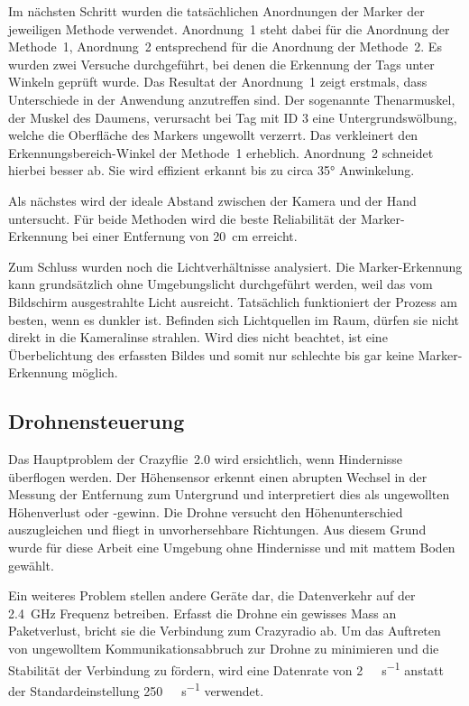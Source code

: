 Im nächsten Schritt wurden die tatsächlichen Anordnungen der Marker der jeweiligen Methode verwendet.
Anordnung~1 steht dabei für die Anordnung der Methode~1, Anordnung~2 entsprechend für die Anordnung der Methode~2.
Es wurden zwei Versuche durchgeführt, bei denen die Erkennung der Tags unter Winkeln geprüft wurde.
Das Resultat der Anordnung~1 zeigt erstmals, dass Unterschiede in der Anwendung anzutreffen sind.
Der sogenannte Thenarmuskel, der Muskel des Daumens, verursacht bei Tag mit ID 3 eine Untergrundswölbung, welche die Oberfläche des Markers ungewollt verzerrt.
Das verkleinert den Erkennungsbereich-Winkel der Methode~1 erheblich.
Anordnung~2 schneidet hierbei besser ab.
Sie wird effizient erkannt bis zu circa 35° Anwinkelung\footnotemark{}.

Als nächstes wird der ideale Abstand zwischen der Kamera und der Hand untersucht.
Für beide Methoden wird die beste Reliabilität der Marker-Erkennung bei einer Entfernung von \SI{20}{\centi\meter} erreicht.

Zum Schluss wurden noch die Lichtverhältnisse analysiert.
Die Marker-Erkennung kann grundsätzlich ohne Umgebungslicht durchgeführt werden, weil das vom Bildschirm ausgestrahlte Licht ausreicht.
Tatsächlich funktioniert der Prozess am besten, wenn es dunkler ist.
Befinden sich Lichtquellen im Raum, dürfen sie nicht direkt in die Kameralinse strahlen.
Wird dies nicht beachtet, ist eine Überbelichtung des erfassten Bildes und somit nur schlechte bis gar keine Marker-Erkennung möglich.

\subsection{Drohnensteuerung}
\label{sec:drco}

Das Hauptproblem der Crazyflie~2.0 wird ersichtlich, wenn Hindernisse überflogen werden.
Der Höhensensor erkennt einen abrupten Wechsel in der Messung der Entfernung zum Untergrund und interpretiert dies als ungewollten Höhenverlust oder -gewinn.
Die Drohne versucht den Höhenunterschied auszugleichen und fliegt in unvorhersehbare Richtungen.
Aus diesem Grund wurde für diese Arbeit eine Umgebung ohne Hindernisse und mit mattem Boden gewählt.

Ein weiteres Problem stellen andere Geräte dar, die Datenverkehr auf der \SI{2.4}{\giga\hertz} Frequenz betreiben.
Erfasst die Drohne ein gewisses Mass an Paketverlust, bricht sie die Verbindung zum Crazyradio ab.
Um das Auftreten von ungewolltem Kommunikationsabbruch zur Drohne zu minimieren und die Stabilität der Verbindung zu fördern, wird eine Datenrate von \SI{2}{\mega\bit\per\second} anstatt der Standardeinstellung \SI{250}{\kilo\bit\per\second} verwendet.

